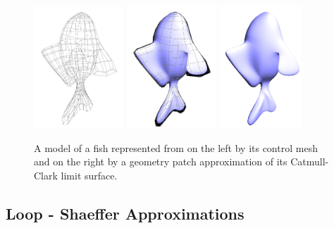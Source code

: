 \documentclass[12pt, letterpaper]{article}
\begin{document}
		\begin{figure}[h]
		\centering
		\includegraphics[width=0.3\textwidth]{fish_cm}
		\includegraphics[width=0.3\textwidth]{fish_cm_and_patch}
		\includegraphics[width=0.275\textwidth]{fish_patch}
		\caption{A model of a fish represented from on the left by its control mesh and on the right by a geometry patch approximation of its Catmull-Clark limit surface.}
		\label{fig:subDDef}
		\end{figure}

	\newpage

	\subsection{Loop - Shaeffer Approximations}
	
\end{document}
